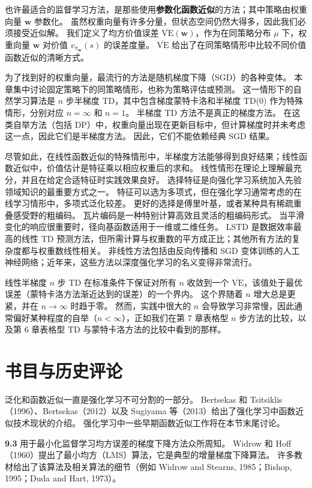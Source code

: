 \documentclass[UTF8, 12pt, fontset=fandol, oneside]{ctexart}
\begin{document}
也许最适合的监督学习方法，是那些使用\textbf{参数化函数近似}的方法；其中策略由权重向量 $\mathbf{w}$ 参数化。
虽然权重向量有许多分量，但状态空间仍然大得多，因此我们必须接受近似解。
我们定义了均方价值误差 $\overline{\mathrm{VE}}(\mathbf{w})$，作为在同策略分布 $\mu$ 下，权重向量 $\mathbf{w}$ 对价值 $v_{\pi_{\mathbf{w}}}(s)$ 的误差度量。
$\overline{\mathrm{VE}}$ 给出了在同策略情形中比较不同价值函数近似的清晰方式。

为了找到好的权重向量，最流行的方法是随机梯度下降（SGD）的各种变体。
本章集中讨论固定策略下的同策略情形，也称为策略评估或预测。
这一情形下的自然学习算法是 $n$ 步半梯度 TD，其中包含梯度蒙特卡洛和半梯度 TD(0) 作为特殊情形，分别对应 $n=\infty$ 和 $n=1$。
半梯度 TD 方法不是真正的梯度方法。
在这类自举方法（包括 DP）中，权重向量出现在更新目标中，但计算梯度时并未考虑这一点，因此它们是半梯度方法。
因此，它们不能依赖经典 SGD 结果。

尽管如此，在线性函数近似的特殊情形中，半梯度方法能够得到良好结果；线性函数近似中，价值估计是特征乘以相应权重后的求和。
线性情形在理论上理解最充分，并且在给定合适特征时实践效果良好。
选择特征是向强化学习系统加入先验领域知识的最重要方式之一。
特征可以选为多项式，但在强化学习通常考虑的在线学习情形中，多项式泛化较差。
更好的选择是傅里叶基，或者某种具有稀疏重叠感受野的粗编码。
瓦片编码是一种特别计算高效且灵活的粗编码形式。
当平滑变化的响应很重要时，径向基函数适用于一维或二维任务。
LSTD 是数据效率最高的线性 TD 预测方法，但所需计算与权重数的平方成正比；其他所有方法的复杂度都与权重数线性相关。
非线性方法包括由反向传播和 SGD 变体训练的人工神经网络；近年来，这些方法以深度强化学习的名义变得非常流行。

线性半梯度 $n$ 步 TD 在标准条件下保证对所有 $n$ 收敛到一个 $\overline{\mathrm{VE}}$，该值处于最优误差（蒙特卡洛方法渐近达到的误差）的一个界内。
这个界随着 $n$ 增大总是更紧，并在 $n\to\infty$ 时趋于零。
然而，实践中很大的 $n$ 会导致学习非常慢，因此通常偏好某种程度的自举（$n<\infty$），正如我们在第 7 章表格型 $n$ 步方法的比较，以及第 6 章表格型 TD 与蒙特卡洛方法的比较中看到的那样。

\section*{书目与历史评论}

泛化和函数近似一直是强化学习不可分割的一部分。
Bertsekas 和 Tsitsiklis（1996）、Bertsekas（2012）以及 Sugiyama 等（2013）给出了强化学习中函数近似技术现状的介绍。
强化学习中一些早期函数近似工作将在本节末尾讨论。

\noindent\textbf{9.3}
用于最小化监督学习均方误差的梯度下降方法众所周知。
Widrow 和 Hoff（1960）提出了最小均方（LMS）算法，它是典型的增量梯度下降算法。
许多教材给出了该算法及相关算法的细节（例如 Widrow and Stearns, 1985；Bishop, 1995；Duda and Hart, 1973）。
\end{document}
